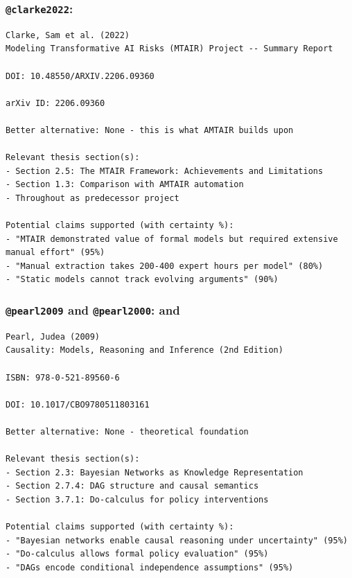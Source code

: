 \documentclass[
  11pt,
  letterpaper,
]{book}
\begin{document}
\subsubsection{\texorpdfstring{\texttt{@clarke2022}:
\textcite{clarke2022}}{@clarke2022: @clarke2022}}\label{clarke2022-clarke2022-1}

\begin{verbatim}
Clarke, Sam et al. (2022)
Modeling Transformative AI Risks (MTAIR) Project -- Summary Report

DOI: 10.48550/ARXIV.2206.09360

arXiv ID: 2206.09360

Better alternative: None - this is what AMTAIR builds upon

Relevant thesis section(s):
- Section 2.5: The MTAIR Framework: Achievements and Limitations
- Section 1.3: Comparison with AMTAIR automation
- Throughout as predecessor project

Potential claims supported (with certainty %):
- "MTAIR demonstrated value of formal models but required extensive manual effort" (95%)
- "Manual extraction takes 200-400 expert hours per model" (80%)
- "Static models cannot track evolving arguments" (90%)
\end{verbatim}

\subsubsection{\texorpdfstring{\texttt{@pearl2009} and
\texttt{@pearl2000}: \textcite{pearl2000} and
\textcite{pearl2009}}{@pearl2009 and @pearl2000: @pearl2000 and @pearl2009}}\label{pearl2009-and-pearl2000-pearl2000-and-pearl2009-1}

\begin{verbatim}
Pearl, Judea (2009)
Causality: Models, Reasoning and Inference (2nd Edition)

ISBN: 978-0-521-89560-6

DOI: 10.1017/CBO9780511803161

Better alternative: None - theoretical foundation

Relevant thesis section(s):
- Section 2.3: Bayesian Networks as Knowledge Representation
- Section 2.7.4: DAG structure and causal semantics
- Section 3.7.1: Do-calculus for policy interventions

Potential claims supported (with certainty %):
- "Bayesian networks enable causal reasoning under uncertainty" (95%)
- "Do-calculus allows formal policy evaluation" (95%)
- "DAGs encode conditional independence assumptions" (95%)
\end{verbatim}
\end{document}
